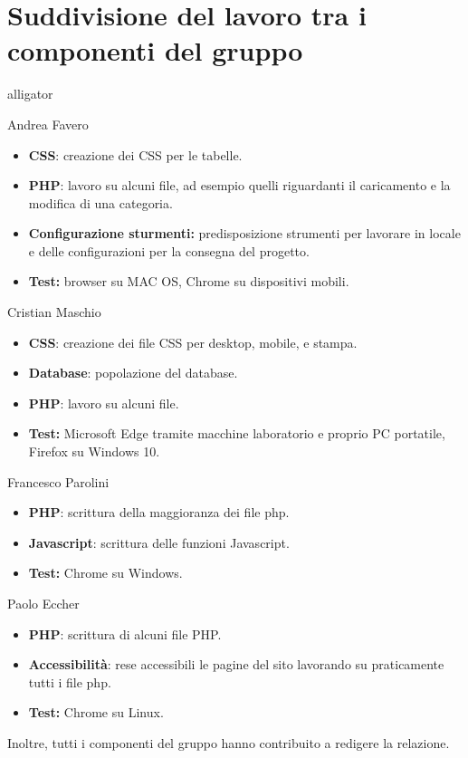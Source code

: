 \documentclass[10pt, a4paper]{article}
\begin{document}
\section{Suddivisione del lavoro tra i componenti del gruppo}
\begin{labeling}{alligator}
	\item[Andrea Favero] \item[] %
		\begin{itemize}
			\item{\textbf{CSS}: creazione dei CSS per le tabelle.}
			\item{\textbf{PHP}: lavoro su alcuni file, ad esempio quelli riguardanti il
			caricamento e la modifica di una categoria.}
			\item{\textbf{Configurazione sturmenti:} predisposizione strumenti per lavorare in locale e
			delle configurazioni per la consegna del progetto.}
			\item{\textbf{Test:} browser su MAC OS, Chrome su dispositivi mobili.}
		\end{itemize}
	\item[Cristian Maschio] \item[]
		\begin{itemize}
			\item{\textbf{CSS}: creazione dei file CSS per desktop, mobile, e stampa.}
			\item{\textbf{Database}: popolazione del database.}
			\item{\textbf{PHP}: lavoro su alcuni file.}
			\item{\textbf{Test:} Microsoft Edge tramite macchine laboratorio e proprio
				PC portatile, Firefox su Windows 10.}
		\end{itemize}
	\item[Francesco Parolini] \item[]
		\begin{itemize}
			\item{\textbf{PHP}: scrittura della maggioranza dei file php.}
			\item{\textbf{Javascript}: scrittura delle funzioni Javascript.}
			\item{\textbf{Test:}  Chrome su Windows.}
		\end{itemize}
	\item[Paolo Eccher] \item[]
		\begin{itemize}	
			\item{\textbf{PHP}: scrittura di alcuni file PHP.}
			\item{\textbf{Accessibilità}: rese accessibili le pagine del sito lavorando su praticamente tutti i file php.}
			\item{\textbf{Test:}  Chrome su Linux.}
		\end{itemize}
\end{labeling}
Inoltre, tutti i componenti del gruppo hanno contribuito a redigere la relazione.
\end{document}
